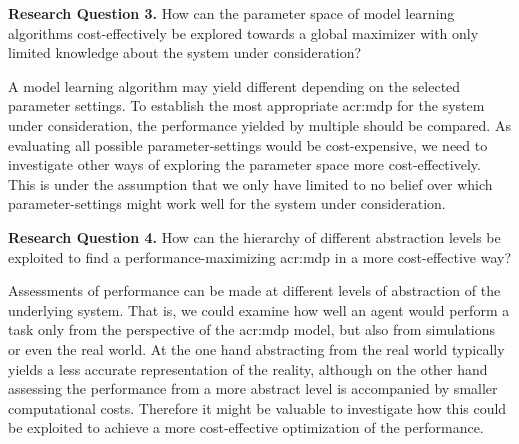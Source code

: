 \vspace{12pt}
\noindent\textbf{Research Question 3.} How can the parameter space of model learning algorithms cost-effectively be explored towards a global maximizer with only limited knowledge about the system under consideration?
\vspace{12pt}

A model learning algorithm may yield different  depending on the selected parameter settings.
To establish the most appropriate \acrshort{acr:mdp} for the system under consideration, the performance yielded by multiple  should be compared.
As evaluating all possible parameter-settings would be cost-expensive, we need to investigate other ways of exploring the parameter space more cost-effectively.
This is under the assumption that we only have limited to no belief over which parameter-settings might work well for the system under consideration.

\vspace{12pt}
\noindent\textbf{Research Question 4.} How can the hierarchy of different abstraction levels be exploited to find a performance-maximizing \acrshort{acr:mdp} in a more cost-effective way?
\vspace{12pt}

Assessments of performance can be made at different levels of abstraction of the underlying system.
That is, we could examine how well an agent would perform a task only from the perspective of the \acrshort{acr:mdp} model, but also
from simulations or even the real world.
At the one hand abstracting from the real world typically yields a less accurate representation of the reality, although on the other hand assessing the performance from a more abstract level is accompanied by smaller computational costs.
Therefore it might be valuable to investigate how this could be exploited to achieve a more cost-effective optimization of the performance.


